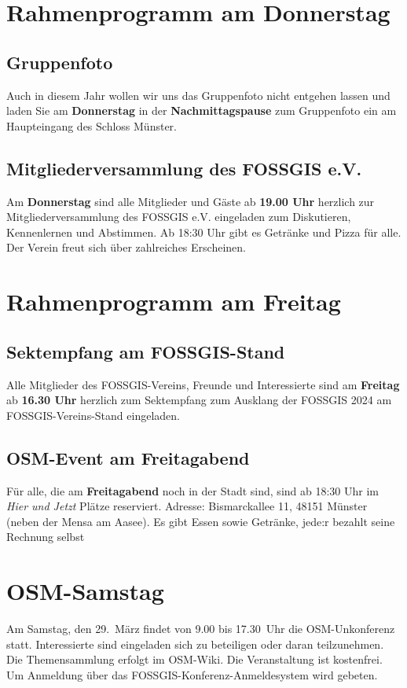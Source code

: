 \section*{Rahmenprogramm am Donnerstag}
\subsection*{Gruppenfoto}
Auch in diesem Jahr wollen wir uns das Gruppenfoto nicht entgehen lassen und laden Sie am {\bfseries Donnerstag} in der {\bfseries Nachmittagspause} zum Gruppenfoto ein am Haupteingang des Schloss Münster.

\subsection*{Mitgliederversammlung des FOSSGIS e.V.}
Am {\bfseries Donnerstag} sind alle Mitglieder und Gäste ab {\bfseries 19.00 Uhr} herzlich zur Mitgliederversammlung des FOSSGIS e.V. eingeladen zum Diskutieren, Kennenlernen und Abstimmen. Ab 18:30 Uhr
gibt es Getränke und Pizza für alle. Der Verein freut sich über zahlreiches Erscheinen.

\newpage
\section*{Rahmenprogramm am Freitag}

\subsection*{Sektempfang am FOSSGIS-Stand}
Alle Mitglieder des FOSSGIS-Vereins, Freunde und Interessierte sind am {\bfseries Freitag} ab {\bfseries 16.30 Uhr} herzlich zum Sektempfang zum Ausklang der FOSSGIS 2024 am FOSSGIS-Vereins-Stand eingeladen.

\subsection*{OSM-Event am Freitagabend}
Für alle, die am {\bfseries Freitagabend} noch in der Stadt sind, sind  ab 18:30 Uhr im {\em Hier und Jetzt} Plätze reserviert. Adresse: Bismarck\-allee 11, 48151 Münster (neben der Mensa am Aasee). Es gibt Essen sowie Getränke, jede:r bezahlt seine Rechnung selbst

\newpage
\section*{OSM-Samstag}
Am Samstag, den 29.~März findet von 9.00 bis 17.30~Uhr die OSM-Unkonferenz statt.
Interessierte sind eingeladen sich zu beteiligen oder daran teilzunehmen.
Die Themensammlung erfolgt im OSM-Wiki. Die Veranstaltung ist kostenfrei.
Um Anmeldung über das FOSSGIS-Konferenz-Anmeldesystem wird gebeten.


